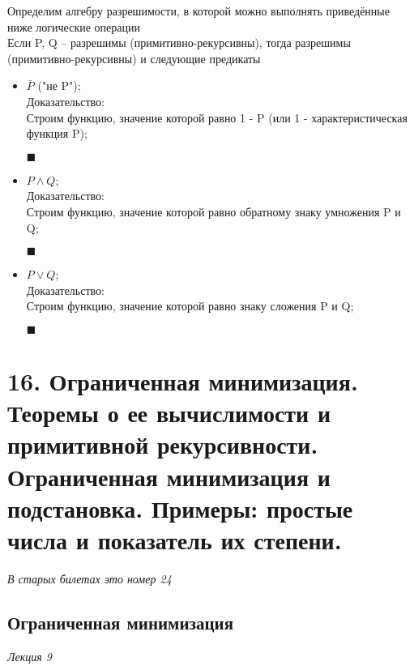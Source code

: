     Определим алгебру разрешимости, в которой можно выполнять приведённые ниже логические операции\\
    Если P, Q -- разрешимы (примитивно-рекурсивны), тогда разрешимы (примитивно-рекурсивны) и следующие предикаты
    \begin{itemize}
        \item $\bar P$ ("не P");\\
        Доказательство:
        \\ Строим функцию, значение которой равно 1 - P (или 1 - характеристическая функция P);
        \begin{flushright}
            $\blacksquare$
        \end{flushright}
        \item $P \wedge Q$;\\
        Доказательство:
        \\ Строим функцию, значение которой равно обратному знаку умножения P и Q;
        \begin{flushright}
            $\blacksquare$
        \end{flushright}

        \item $P \vee Q$;\\
        Доказательство:
        \\ Строим функцию, значение которой равно знаку сложения P и Q;
        \begin{flushright}
            $\blacksquare$
        \end{flushright}
    \end{itemize}
    

\section{16. Ограниченная минимизация. Теоремы о ее вычислимости и примитивной рекурсивности.
Ограниченная минимизация и подстановка. Примеры: простые числа и показатель их
степени.}    

\emph{В старых билетах это номер 24}\\

    \subsection{Ограниченная минимизация}
    \emph{Лекция 9}
        
